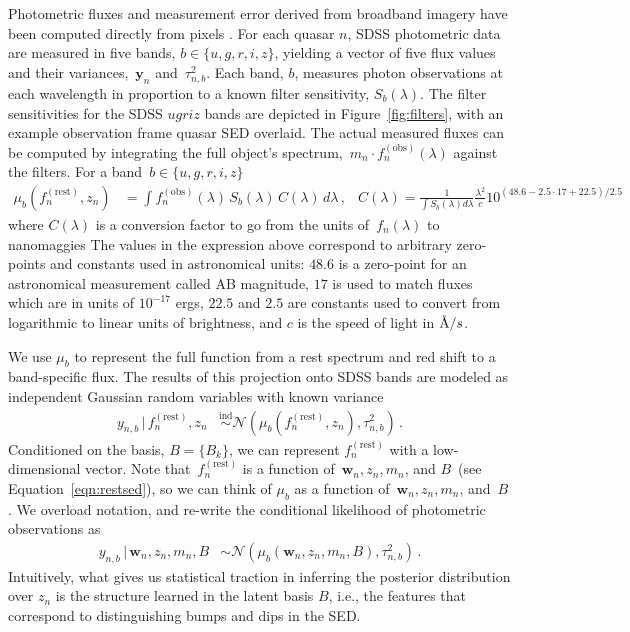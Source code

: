 \documentclass{article} %
\begin{document}
Photometric fluxes and measurement error derived from broadband imagery have been computed directly from pixels \cite{stoughton2002sloan}.  
For each quasar $n$, SDSS photometric data are measured in five bands, ${b \in \{u,g,r,i,z\}}$, yielding a vector of five flux values and their variances,~$\mathbf{y}_n$ and~$\tau^2_{n, b}$.  
Each band, $b$, measures photon observations at each wavelength in proportion to a known filter sensitivity, $S_{b}(\lambda)$. 
The filter sensitivities for the SDSS $ugriz$ bands are depicted in Figure~\ref{fig:filters}, with an example observation frame quasar SED overlaid.  
The actual measured fluxes can be computed by integrating the full object's spectrum,~${m_n \cdot f_n^{(\text{obs})}(\lambda)}$ against the filters.
For a band~${b \in \{u, g, r, i, z \}}$
\begin{align}
  \mu_b(f_n^{(\text{rest})}, z_n) &= \int f^{(\text{obs})}_n(\lambda) \,S_b(\lambda)\, C(\lambda) \,d \lambda \,,
  & C(\lambda) = \frac{1}{\int S_b(\lambda) d\lambda} \frac{\lambda^2}{c} 10^{(48.6-2.5\cdot 17+22.5)/2.5} \,
\end{align}
where $C(\lambda)$ is a conversion factor to go from the units of~$f_n(\lambda)$ to nanomaggies
The values in the expression above correspond to arbitrary zero-points and constants used in astronomical units: $48.6$ is a zero-point for an astronomical measurement called AB magnitude, $17$ is used to match fluxes which are in units of $10^{-17}$ ergs, $22.5$ and $2.5$ are constants used to convert from logarithmic to linear units of brightness, and $c$ is the speed of light in $\textup{\AA}/s$.  

 We use $\mu_b$ to represent the full function from a rest spectrum and red shift to a band-specific flux.
 The results of this projection onto SDSS bands are modeled as independent Gaussian random variables with known variance
\begin{align}
  y_{n,b}\, |\, f_n^{(\text{rest})}, z_n 
    &\stackrel{\textrm{ind}}{\sim} 
      \mathcal{N}( \mu_b(f_n^{(\text{rest})}, z_n), \tau^2_{n,b} ) \, .
\end{align}
Conditioned on the basis, ${B = \{B_k\}}$, we can represent $f_n^{(\text{rest})}$ with a low-dimensional vector.
Note that~$f_n^{(\text{rest})}$ is a function of~${\mathbf{w}_n, z_n, m_n}$, and $B$~(see Equation~\ref{eqn:restsed}), so we can think of $\mu_b$ as a function of~${\mathbf{w}_n, z_n, m_n}$, and~$B$.
We overload notation, and re-write the conditional likelihood of photometric observations as
\begin{align}
    y_{n,b} \,|\, \mathbf{w}_n, z_n, m_n, B &\sim \mathcal{N}( \mu_b(\mathbf{w}_n, z_n, m_n, B), \tau^2_{n,b} ) \, .
   \label{eq:phot}
\end{align}
Intuitively, what gives us statistical traction in inferring the posterior distribution over $z_n$ is the structure learned in the latent basis $B$, i.e., the features that correspond to distinguishing bumps and dips in the SED.
\end{document}
